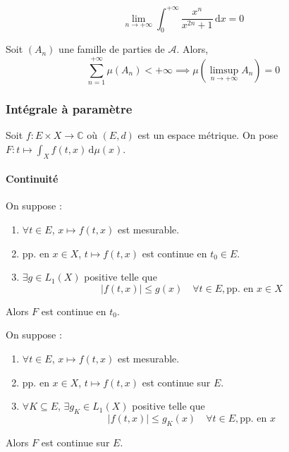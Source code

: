 
	\begin{example}
		\[ \lim_{n \rightarrow +\infty} \int_{0}^{+\infty} \frac{x^n}{x^{2n} + 1} \, \mathrm{d}x = 0 \]
	\end{example}


	\begin{application}
		Soit $(A_n)$ une famille de parties de $\mathcal{A}$. Alors,
		\[ \sum_{n=1}^{+\infty} \mu(A_n) < +\infty \implies \mu \left( \limsup_{n \rightarrow +\infty} A_n \right) = 0 \]
	\end{application}

	\subsubsection{Intégrale à paramètre}


	Soit $f : E \times X \rightarrow \mathbb{C}$ où $(E, d)$ est un espace métrique. On pose $F : t \mapsto \int_X f(t, x) \, \mathrm{d}\mu(x)$.

	\paragraph{Continuité}

	\begin{theorem}
		On suppose :
		\begin{enumerate}[label=(\roman*)]
			\item $\forall t \in E$, $x \mapsto f(t,x)$ est mesurable.
			\item pp. en $x \in X$, $t \mapsto f(t,x)$ est continue en $t_0 \in E$.
			\item $\exists g \in L_1(X)$ positive telle que
			\[ |f(t,x)| \leq g(x) \quad \forall t \in E, \text{pp. en } x \in X \]
		\end{enumerate}
		Alors $F$ est continue en $t_0$.
	\end{theorem}

	\begin{corollary}
		On suppose :
		\begin{enumerate}[label=(\roman*)]
			\item $\forall t \in E$, $x \mapsto f(t,x)$ est mesurable.
			\item pp. en $x \in X$, $t \mapsto f(t,x)$ est continue sur $E$.
			\item $\forall K \subseteq E, \, \exists g_K \in L_1(X)$ positive telle que
			\[ |f(t,x)| \leq g_K(x) \quad \forall t \in E, \text{pp. en } x \]
		\end{enumerate}
		Alors $F$ est continue sur $E$.
	\end{corollary}

